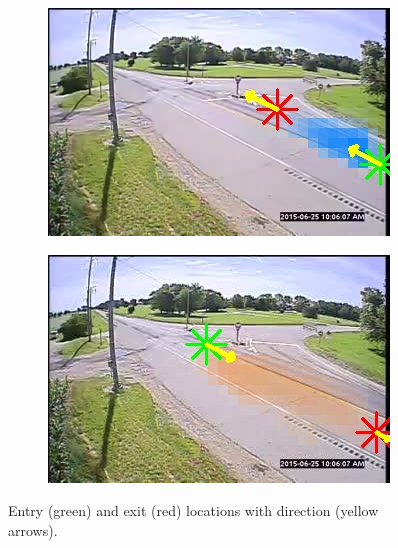 \begin{figure}[!h]
    \centering
        \begin{subfigure}{0.32\linewidth}
            \includegraphics[width=\linewidth]{./img/scene_learning/res/243948/243948-0.jpg}
        \end{subfigure}
        \begin{subfigure}{0.32\linewidth}
            \includegraphics[width=\linewidth]{./img/scene_learning/res/243948/243948-1.jpg}
        \end{subfigure}
        \caption{Entry (green) and exit (red) locations with direction (yellow arrows).}
        \label{fig:entry-exit-full-1}
\end{figure}
